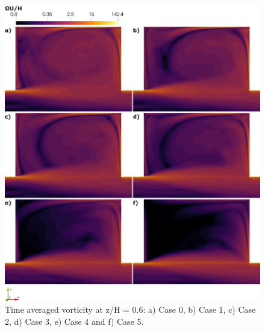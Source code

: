 \begin{figure}[!ht]
\centering
\includegraphics[width=\linewidth]{../images/art4/vorticityMean1.jpeg}
\caption{Time averaged vorticity at z/H = 0.6: a) Case 0, b) Case 1, c) Case 2, d) Case 3, e) Case 4 and f) Case 5.}
\label{fig:art4:vorticityMean1}
\end{figure}

